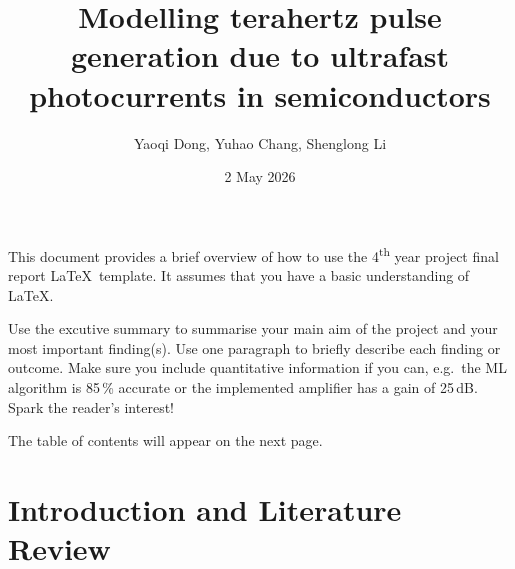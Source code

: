 \documentclass[12pt]{final_project_report}
\title{Modelling terahertz pulse generation due to ultrafast photocurrents in semiconductors }
\author{Yaoqi Dong, Yuhao Chang, Shenglong Li}
\date{2 May 2026}
\begin{document}
\coverpage
\declaration
\maketitle
\begin{exec_summary}
This document provides a brief overview of how to use the 4\textsuperscript{th} year project final report \LaTeX\ template. It assumes that you have a basic understanding of \LaTeX.

Use the excutive summary to summarise your main aim of the project and your most important finding(s). Use one paragraph to briefly describe each finding or outcome. Make sure you include quantitative information if you can, e.g.\ the ML algorithm is 85\,\% accurate or the implemented amplifier has a gain of 25\,dB. Spark the reader’s interest!

The table of contents will appear on the next page.
\end{exec_summary}
\tableofcontents

\section{Introduction and Literature Review}
\end{document}
